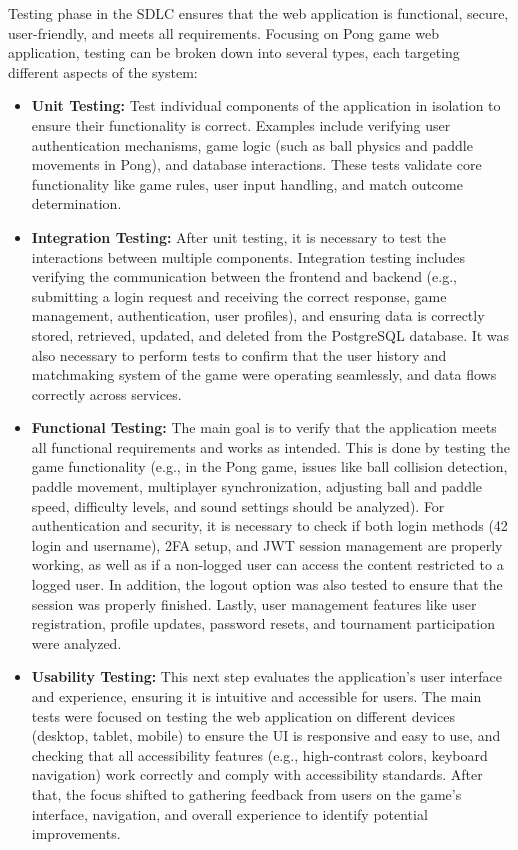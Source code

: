 Testing phase in the SDLC ensures that the web application is functional, secure, user-friendly, and meets all requirements. Focusing on Pong game web application, testing can be broken down into several types, each targeting different aspects of the system:
\begin{itemize}
    \item \textbf{Unit Testing:} Test individual components of the application in isolation to ensure their functionality is correct. Examples include verifying user authentication mechanisms, game logic (such as ball physics and paddle movements in Pong), and database interactions. These tests validate core functionality like game rules, user input handling, and match outcome determination.
    
    \item \textbf{Integration Testing:} After unit testing, it is necessary to test the interactions between multiple components. Integration testing includes verifying the communication between the frontend and backend (e.g., submitting a login request and receiving the correct response, game management, authentication, user profiles), and ensuring data is correctly stored, retrieved, updated, and deleted from the PostgreSQL database. It was also necessary to perform tests to confirm that the user history and matchmaking system of the game were operating seamlessly, and data flows correctly across services.
    
    \item \textbf{Functional Testing:} The main goal is to verify that the application meets all functional requirements and works as intended. This is done by testing the game functionality (e.g., in the Pong game, issues like ball collision detection, paddle movement, multiplayer synchronization, adjusting ball and paddle speed, difficulty levels, and sound settings should be analyzed). For authentication and security, it is necessary to check if both login methods (42 login and username), 2FA setup, and JWT session management are properly working, as well as if a non-logged user can access the content restricted to a logged user. In addition, the logout option was also tested to ensure that the session was properly finished. Lastly, user management features like user registration, profile updates, password resets, and tournament participation were analyzed.
    
    \item \textbf{Usability Testing:} This next step evaluates the application's user interface and experience, ensuring it is intuitive and accessible for users. The main tests were focused on testing the web application on different devices (desktop, tablet, mobile) to ensure the UI is responsive and easy to use, and checking that all accessibility features (e.g., high-contrast colors, keyboard navigation) work correctly and comply with accessibility standards. After that, the focus shifted to gathering feedback from users on the game's interface, navigation, and overall experience to identify potential improvements.
    

\end{itemize}
